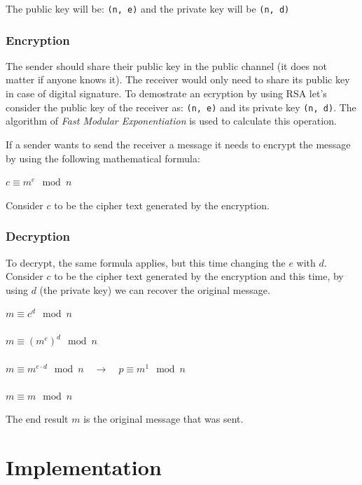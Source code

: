 \documentclass[usenames,dvipsnames,12pt]{report}
\begin{document}
The public key will be: \texttt{(n, e)} and the private key will be \texttt{(n, d)}

\subsection{Encryption}

The sender should share their public key in the public channel (it does not matter if anyone knows it).
The receiver would only need to share its public key in case of digital signature.
To demostrate an ecryption by using RSA let's consider the public key of the receiver as: \texttt{(n, e)} and its
private key \texttt{(n, d)}. The algorithm of \textit{Fast Modular Exponentiation} is used to calculate this operation.

If a sender wants to send the receiver a message it needs to encrypt the message by using the following mathematical formula:

\begin{center}
    $c \equiv m^e \mod n$
\end{center}

Consider $c$ to be the cipher text generated by the encryption.

\subsection{Decryption}

To decrypt, the same formula applies, but this time changing the $e$ with $d$.
Consider $c$ to be the cipher text generated by the encryption and this time, by using
$d$ (the private key) we can recover the original message.

\begin{center}
    $m \equiv c^d \mod n$ \\~\\
    $m \equiv (m^e)^d \mod n$ \\~\\
    $m \equiv m^{e \cdot d} \mod n \quad \rightarrow \quad p \equiv m^1 \mod n$ \\~\\
    $\boxed{m \equiv m \mod n}$
\end{center}

The end result $m$ is the original message that was sent.

\chapter{Implementation}
\end{document}
